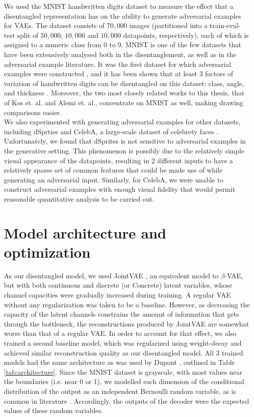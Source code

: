 \documentclass{report}
\begin{document}
\noindent We used the MNIST handwritten digits dataset to measure the effect that a disentangled representation has on the ability to generate adversarial examples for VAEs. The dataset consists of $70,000$ images (partitioned into a train-eval-test split of $50,000$, $10,000$ and $10,000$ datapoints, respectively), each of which is assigned to a numeric class from 0 to 9. MNIST is one of the few datasets that have been extensively analysed both in the disentanglement, as well as in the adversarial example literature. It was the first dataset for which adversarial examples were constructed \cite{intriguing-properties}, and it has been shown that at least 3 factors of variation of handwritten digits can be disentangled on this dataset: class, angle, and thickness \cite{infogan, joint-vae}. Moreover, the two most closely related works to this thesis, that of Kos et. al. and Alemi et. al., concentrate on MNIST as well, making drawing comparisons easier. \\

\noindent We also experimented with generating adversarial examples for other datasets, including dSprties and CelebA, a large-scale dataset of celebrety faces \cite{celeba}. Unfortunately, we found that dSprites is not sensitive to adversarial examples in the generative setting. This phenomenon is possibly due to the relatively simple visual appearance of the datapoints, resulting in 2 different inputs to have a relatively sparse set of common features that could be made use of while generating an adversarial input. Similarly, for CelebA, we were unable to construct adversarial examples with enough visual fidelity that would permit reasonable quantitative analysis to be carried out. \\

\section{Model architecture and optimization}

\noindent As our disentangled model, we used JointVAE \cite{joint-vae}, an equivalent model to $\beta$-VAE, but with both continuous and discrete (or Concrete) latent variables, whose channel capacities were gradually increased during training. A regular VAE without any regularization was taken to be a baseline. However, as decreasing the capacity of the latent channels constrains the amount of information that gets through the bottleneck, the reconstructions produced by JointVAE are somewhat worse than that of a regular VAE. In order to account for that effect, we also trained a second baseline model, which was regularized using weight-decay and achieved similar reconstruction quality as our disentangled model. All 3 trained models had the same architecture as was used by Dupont \cite{joint-vae}, outlined in Table \ref{tab:architecture}. Since the MNIST dataset is grayscale, with most values near the boundaries (i.e. near 0 or 1), we modelled each dimension of the conditional distribution of the output as an independent Bernoulli random variable, as is common in literature \cite{vae, beta-vae}. Accordingly, the outputs of the decoder were the expected values of these random variables. \\
\end{document}
